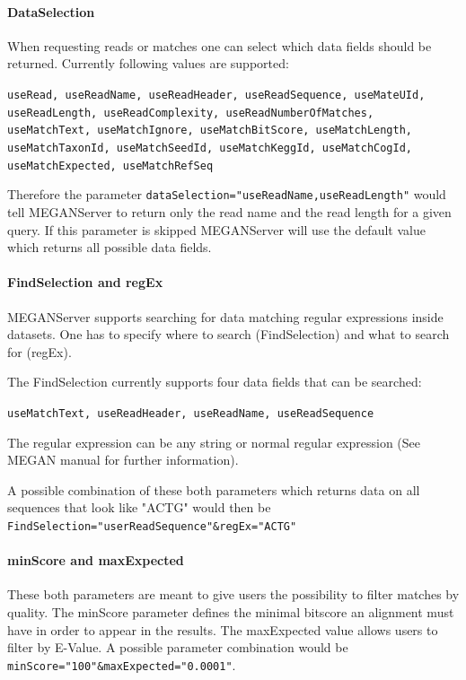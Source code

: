 \documentclass[11pt]{article}
\begin{document}
\paragraph{DataSelection}
\label{subsec:datasel}

When requesting reads or matches one can select which data fields should be returned. Currently following values are supported:


\texttt{useRead, useReadName, useReadHeader, useReadSequence, useMateUId, useReadLength, useReadComplexity, useReadNumberOfMatches, useMatchText, useMatchIgnore, useMatchBitScore, useMatchLength, useMatchTaxonId, useMatchSeedId, useMatchKeggId, useMatchCogId, useMatchExpected, useMatchRefSeq}

Therefore the parameter \texttt{dataSelection="useReadName,useReadLength"} would tell MEGANServer to return only the read name and the read length for a given query. If this parameter is skipped MEGANServer will use the default value which returns all possible data fields.






\paragraph{FindSelection and regEx}
\label{subsec:findsel}
MEGANServer supports searching for data matching regular expressions inside datasets. One has to specify where to search (FindSelection) and what to search for (regEx).

The FindSelection currently supports four data fields that can be searched:

\texttt{useMatchText, useReadHeader, useReadName, useReadSequence}

The regular expression can be any string or normal regular expression (See MEGAN manual for further information). 

A possible combination of these both parameters which returns data on all sequences that look like "ACTG" would then be \texttt{FindSelection="userReadSequence"\&regEx="ACTG"}




\paragraph{minScore and maxExpected}
\label{subsec:minScore}
These both parameters are meant to give users the possibility to filter matches by quality. The minScore parameter defines the minimal bitscore an alignment must have in order to appear in the results. The maxExpected value allows users to filter by E-Value. A possible parameter combination would be \texttt{minScore="100"\&maxExpected="0.0001"}.
\end{document}
